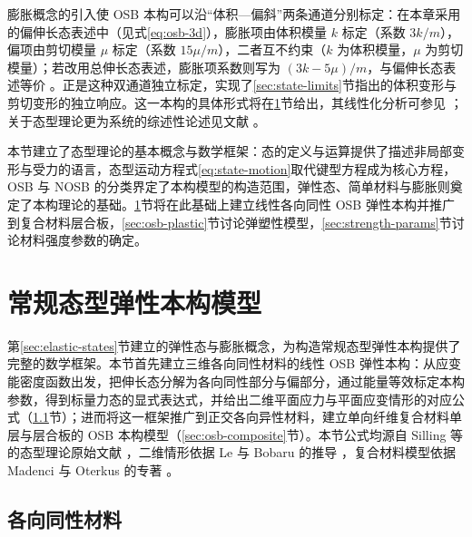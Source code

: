 膨胀概念的引入使 OSB 本构可以沿“体积—偏斜”两条通道分别标定：在本章采用的偏伸长态表述中（见式\eqref{eq:osb-3d}），膨胀项由体积模量 $k$ 标定（系数 $3k/m$），偏项由剪切模量 $\mu$ 标定（系数 $15\mu/m$），二者互不约束（$k$ 为体积模量，$\mu$ 为剪切模量）；若改用总伸长态表述，膨胀项系数则写为 $(3k-5\mu)/m$，与偏伸长态表述等价 \cite{Silling2007}。正是这种双通道独立标定，实现了\ref{sec:state-limits}节指出的体积变形与剪切变形的独立响应。这一本构的具体形式将在\ref{sec:osb-elastic}节给出，其线性化分析可参见 \cite{Silling2010,SillingLehoucq2010}；关于态型理论更为系统的综述性论述见文献 \cite{Bobaru2016}。

本节建立了态型理论的基本概念与数学框架：态的定义与运算提供了描述非局部变形与受力的语言，态型运动方程式\eqref{eq:state-motion}取代键型方程成为核心方程，OSB 与 NOSB 的分类界定了本构模型的构造范围，弹性态、简单材料与膨胀则奠定了本构理论的基础。\ref{sec:osb-elastic}节将在此基础上建立线性各向同性 OSB 弹性本构并推广到复合材料层合板，\ref{sec:osb-plastic}节讨论弹塑性模型，\ref{sec:strength-params}节讨论材料强度参数的确定。


\section{常规态型弹性本构模型}\label{sec:osb-elastic}

第\ref{sec:elastic-states}节建立的弹性态与膨胀概念，为构造常规态型弹性本构提供了完整的数学框架。本节首先建立三维各向同性材料的线性 OSB 弹性本构：从应变能密度函数出发，把伸长态分解为各向同性部分与偏部分，通过能量等效标定本构参数，得到标量力态的显式表达式，并给出二维平面应力与平面应变情形的对应公式（\ref{sec:osb-isotropic}节）；进而将这一框架推广到正交各向异性材料，建立单向纤维复合材料单层与层合板的 OSB 本构模型（\ref{sec:osb-composite}节）。本节公式均源自 Silling 等的态型理论原始文献 \cite{Silling2007}，二维情形依据 Le 与 Bobaru 的推导 \cite{LeBobaru2018Obj}，复合材料模型依据 Madenci 与 Oterkus 的专著 \cite{MadenciOterkus2014}。

\subsection{各向同性材料}\label{sec:osb-isotropic}

